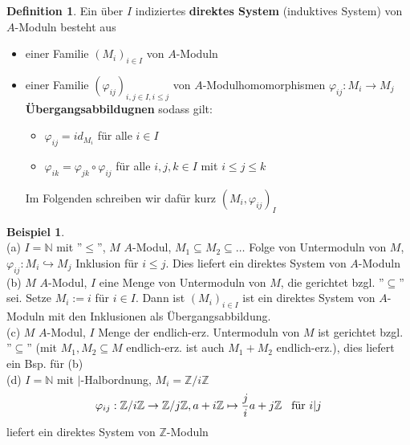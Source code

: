 \documentclass[10pt,a4paper,numbers=endperiod]{scrreprt}
\theoremstyle{definition}
\newtheorem{defi}[satz]{Definition}
\newtheorem{bsp}[satz]{Beispiel}
\def\NN{{\mathbb N}}
\def\ZZ{{\mathbb Z}}
\begin{document}
\begin{defi}
	Ein über $I$ indiziertes \textbf{direktes System} (induktives System) von $A$-Moduln besteht aus \begin{itemize}
		\item einer Familie $(M_i)_{i \in I}$ von $A$-Moduln
		\item einer Familie $(\varphi_{ij})_{i,j \in I, i \leq j}$ von $A$-Modulhomomorphismen $\varphi_{ij}: M_i \to M_j$ \textbf{Übergangsabbildugnen}
		sodass gilt: \begin{itemize}
			\item $\varphi_{ij} = id_{M_i}$ für alle $i \in I$\\
			\item $\varphi_{ik} = \varphi_{jk} \circ \varphi_{ij}$ für alle $i,j,k \in I$ mit $i \leq j \leq k$
		\end{itemize}
	Im Folgenden schreiben wir dafür kurz $(M_i, \varphi_{ij})_I$
	\end{itemize}
\end{defi}

\begin{bsp}
	$ $\\
	(a) $I = \NN$ mit ''$\leq$'', $M$ $A$-Modul, $M_1 \subseteq M_2 \subseteq \ldots$ Folge von Untermoduln von $M$, $\varphi_{ij}: M_i \hookrightarrow M_j$ Inklusion für $i \leq j$. Dies liefert ein direktes System von $A$-Moduln\\
	(b) $M$ $A$-Modul, $I$ eine Menge von Untermoduln von $M$, die gerichtet bzgl. ''$\subseteq$'' sei. Setze $M_i := i$ für $i \in I$. Dann ist $(M_i)_{i \in I}$ ist ein direktes System von $A$-Moduln mit den Inklusionen als Übergangsabbildung.\\
	(c) $M$ $A$-Modul, $I$ Menge der endlich-erz. Untermoduln von $M$ ist gerichtet bzgl. ''$\subseteq$'' (mit $M_1, M_2 \subseteq M$ endlich-erz. ist auch $M_1+M_2$ endlich-erz.), dies liefert ein Bsp. für (b)\\
	(d) $I = \NN$ mit $|$-Halbordnung, $M_i = \ZZ/i \ZZ$ \begin{align*}
			\varphi_{ij}: \ZZ/i \ZZ \to \ZZ/j \ZZ, a + i \ZZ \mapsto \frac{j}{i} a + j \ZZ \hspace*{3mm} \text{für } i|j
	\end{align*}
	liefert ein direktes System von $\ZZ$-Moduln
\end{bsp}
\end{document}
